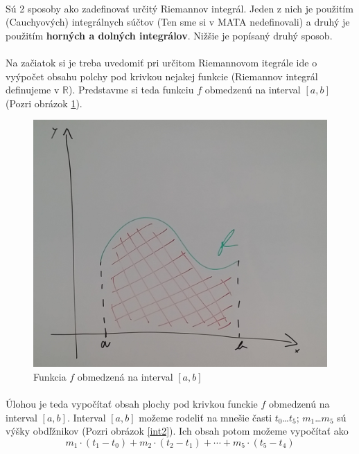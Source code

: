 \documentclass[12pt,a4paper]{article}
\begin{document}
\paragraph{}
Sú 2 sposoby ako zadefinovať určitý Riemannov integrál. Jeden z nich je použitím (Cauchyových) integrálnych súčtov (Ten sme si v MATA nedefinovali) a druhý je použitím \textbf{horných a dolných integrálov}. Nižšie je popísaný druhý sposob.

\paragraph{}
Na začiatok si je treba uvedomiť pri určitom Riemannovom itegrále ide o vyýpočet obsahu polchy pod krivkou nejakej funkcie (Riemannov integrál definujeme v $\mathds{R}$). Predstavme si teda funkciu $f$ obmedzenú na interval $[a, b]$ (Pozri obrázok \ref{int1}). 

\begin{figure}[H]
	\begin{center}
		\includegraphics[scale=0.2]{img/int1}
	\end{center}
	\caption{Funkcia $f$ obmedzená na interval $[a, b]$\label{int1}}
\end{figure}

\paragraph{}
Úlohou je teda vypočítať obsah plochy pod krivkou funckie $f$ obmedzenú na interval $[a, b]$. Interval $[a, b]$ možeme rodeliť na mnešie časti $t_{0}$\dots $t_{5}$; $m_{1}$\dots $m_{5}$ sú výšky obdľžnikov (Pozri obrázok \ref{int2}). Ich obsah potom možeme vypočítať ako $$m_{1}\cdot (t_{1}-t_{0})+m_{2}\cdot (t_{2}-t_{1})+\dotsm + m_{5}\cdot (t_{5}-t_{4})$$ 
\end{document}
